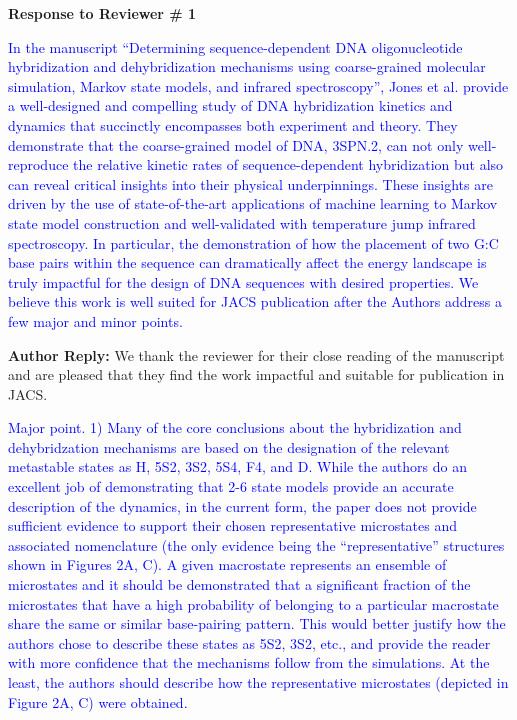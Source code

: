 \documentclass[11pt,a4paper]{letter} %
\begin{document}
\begin{shaded}
\textbf{Response to Reviewer \# 1}
\end{shaded}

\textcolor{blue}{In the manuscript ``Determining sequence-dependent DNA oligonucleotide hybridization and dehybridization mechanisms using coarse-grained molecular simulation, Markov state models, and infrared spectroscopy'', Jones et al. provide a well-designed and compelling study of DNA hybridization kinetics and dynamics that succinctly encompasses both experiment and theory. They demonstrate that the coarse-grained model of DNA, 3SPN.2, can not only well-reproduce the relative kinetic rates of sequence-dependent hybridization but also can reveal critical insights into their physical underpinnings. These insights are driven by the use of state-of-the-art applications of machine learning to Markov state model construction and well-validated with temperature jump infrared spectroscopy. In particular, the demonstration of how the placement of two G:C base pairs within the sequence can dramatically affect the energy landscape is truly impactful for the design of DNA sequences with desired properties. We believe this work is well suited for JACS publication after the Authors address a few major and minor points.}

\textbf{Author Reply:}   We thank the reviewer for their close reading of the manuscript and are pleased that they find the work impactful and suitable for publication in JACS.

\textcolor{blue}{Major point.
1)      Many of the core conclusions about the hybridization and dehybridzation mechanisms are based on the designation of the relevant metastable states as H, 5S2, 3S2, 5S4, F4, and D. While the authors do an excellent job of demonstrating that 2-6 state models provide an accurate description of the dynamics, in the current form, the paper does not provide sufficient evidence to support their chosen representative microstates and associated nomenclature (the only evidence being the ``representative'' structures shown in Figures 2A, C). A given macrostate represents an ensemble of microstates and it should be demonstrated that a significant fraction of the microstates that have a high probability of belonging to a particular macrostate share the same or similar base-pairing pattern. This would better justify how the authors chose to describe these states as 5S2, 3S2, etc., and provide the reader with more confidence that the mechanisms follow from the simulations. At the least, the authors should describe how the representative microstates (depicted in Figure 2A, C) were obtained.
}
\end{document}
